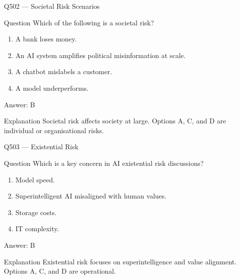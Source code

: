 \documentclass[aspectratio=169,8pt]{beamer}
\begin{document}
	\begin{frame}{Q502 --- Societal Risk Scenarios}
		\begin{block}{Question}
			Which of the following is a societal risk?
			\begin{enumerate}
				\item A bank loses money.
				\item An AI system amplifies political misinformation at scale.
				\item A chatbot mislabels a customer.
				\item A model underperforms.
			\end{enumerate}
		\end{block}
		\begin{exampleblock}{Answer: B}\end{exampleblock}
		\begin{block}{Explanation}
			Societal risk affects society at large. Options A, C, and D are individual or organisational risks.
		\end{block}
	\end{frame}
	
	\begin{frame}{Q503 --- Existential Risk}
		\begin{block}{Question}
			Which is a key concern in AI existential risk discussions?
			\begin{enumerate}
				\item Model speed.
				\item Superintelligent AI misaligned with human values.
				\item Storage costs.
				\item IT complexity.
			\end{enumerate}
		\end{block}
		\begin{exampleblock}{Answer: B}\end{exampleblock}
		\begin{block}{Explanation}
			Existential risk focuses on superintelligence and value alignment. Options A, C, and D are operational.
		\end{block}
	\end{frame}
	
\end{document}
